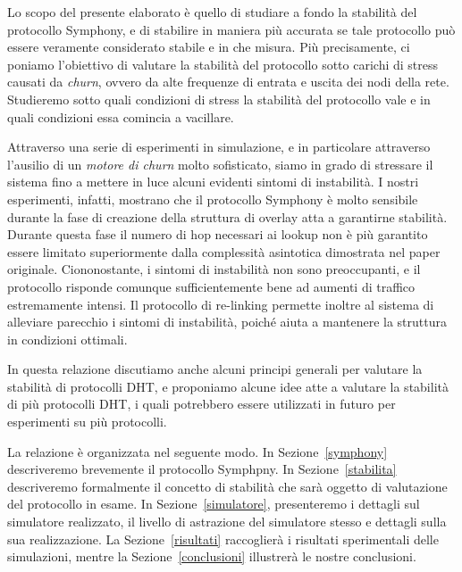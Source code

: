 \documentclass[prodmode,acmtap]{acmlarge}
\begin{document}
Lo scopo del presente elaborato è quello di studiare a fondo la stabilità del protocollo Symphony, e di stabilire in maniera più accurata se tale protocollo può essere veramente considerato stabile e in che misura. Più precisamente, ci poniamo l'obiettivo di valutare la stabilità del protocollo sotto carichi di stress causati da \emph{churn}, ovvero da alte frequenze di entrata e uscita dei nodi della rete. Studieremo sotto quali condizioni di stress la stabilità del protocollo vale e in quali condizioni essa comincia a vacillare.

Attraverso una serie di esperimenti in simulazione, e in particolare attraverso l'ausilio di un \emph{motore di churn} molto sofisticato, siamo in grado di stressare il sistema fino a mettere in luce alcuni evidenti sintomi di instabilità. I nostri esperimenti, infatti, mostrano che il protocollo Symphony è molto sensibile durante la fase di creazione della struttura di overlay atta a garantirne stabilità. Durante questa fase il numero di hop necessari ai lookup non è più garantito essere limitato superiormente dalla complessità asintotica dimostrata nel paper originale. Ciononostante, i sintomi di instabilità non sono preoccupanti, e il protocollo risponde comunque sufficientemente bene ad aumenti di traffico estremamente intensi. Il protocollo di re-linking permette inoltre al sistema di alleviare parecchio i sintomi di instabilità, poiché aiuta a mantenere la struttura in condizioni ottimali.

In questa relazione discutiamo anche alcuni principi generali per valutare la stabilità di protocolli DHT, e proponiamo alcune idee atte a valutare la stabilità di più protocolli DHT, i quali potrebbero essere utilizzati in futuro per esperimenti su più protocolli.

La relazione è organizzata nel seguente modo. In Sezione~\ref{symphony} descriveremo brevemente il protocollo Symphpny. In Sezione~\ref{stabilita} descriveremo formalmente il concetto di stabilità che sarà oggetto di valutazione del protocollo in esame. In Sezione~\ref{simulatore}, presenteremo i dettagli sul simulatore realizzato, il livello di astrazione del simulatore stesso e dettagli sulla sua realizzazione. La Sezione~\ref{risultati} raccoglierà i risultati sperimentali delle simulazioni, mentre la Sezione~\ref{conclusioni} illustrerà le nostre conclusioni.
\end{document}
